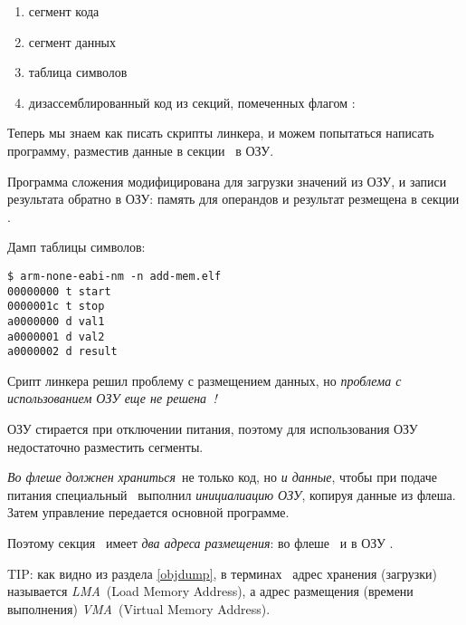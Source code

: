 \begin{enumerate}
\item сегмент кода

\item сегмент данных

\item таблица символов

\item дизассемблированный код из секций, помеченных флагом :
 
\end{enumerate}

\secup
{}\secdown

Теперь мы знаем как писать скрипты линкера, и можем попытаться написать
программу, разместив данные в секции \ в ОЗУ.

Программа сложения модифицирована для загрузки значений из ОЗУ, и записи
результата обратно в ОЗУ: память для операндов и результат резмещена в секции
.



Дамп таблицы символов:

\begin{verbatim}
$ arm-none-eabi-nm -n add-mem.elf
00000000 t start
0000001c t stop
a0000000 d val1
a0000001 d val2
a0000002 d result
\end{verbatim}

Срипт линкера решил проблему с размещением данных, но 
\emph{проблема с использованием ОЗУ еще не решена \,!}
 


ОЗУ стирается при отключении питания, поэтому для использования ОЗУ недостаточно
разместить сегменты.

\begin{framed}
\emph{Во флеше должнен храниться}\ не только код, но \emph{и данные}, чтобы при
подаче питания специальный \ выполнил
\emph{инициалиацию ОЗУ}, копируя данные из флеша. Затем управление передается
основной программе.
\end{framed}

Поэтому секция \ имеет \emph{два адреса размещения}: 
 во флеше \ и 
 в ОЗУ .

TIP: как видно из раздела \ref{objdump}, в терминах \ адрес
хранения (загрузки) называется \emph{LMA}\ (Load Memory Address), а адрес
размещения (времени выполнения) \emph{VMA}\ (Virtual Memory Address).


